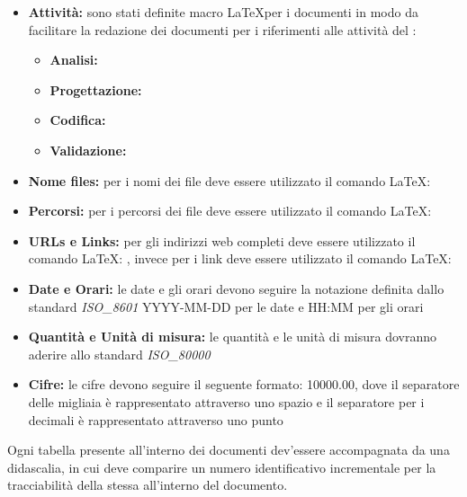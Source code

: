 \documentclass[12pt,a4paper]{article}
\begin{document}
\begin{itemize}
\begin{itemize}
		\item \textbf{\MU:} 
	\end{itemize}
	\item \textbf{Attività:} sono stati definite macro  \LaTeX per i documenti in modo da facilitare la redazione dei documenti per i riferimenti alle attività del \PdP:
	\begin{itemize}
		\item \textbf{Analisi:} 
		\item \textbf{Progettazione:} 
		\item \textbf{Codifica:} 
		\item \textbf{Validazione:} 
	\end{itemize}
\end{itemize}

\label{formati}
\begin{itemize}
	\item \textbf{Nome files:} per i nomi dei file deve essere utilizzato il comando \LaTeX: 
	\item  \textbf{Percorsi:} per i percorsi dei file deve essere utilizzato il comando \LaTeX: 
	\item \textbf{URLs e Links:}  per gli indirizzi web completi deve essere utilizzato il comando \LaTeX: , invece per i link deve essere utilizzato il comando \LaTeX: 
	\item \textbf{Date e Orari:} le date e gli orari devono seguire la notazione definita dallo standard \textit{ISO\_8601} YYYY-MM-DD per le date e HH:MM per gli orari
	\item \textbf{Quantità e Unità di misura:} le quantità e le unità di misura dovranno aderire allo standard \textit{ISO\_80000}
	\item \textbf{Cifre:} le cifre devono seguire il seguente formato: \num{10000.00}, dove il separatore delle migliaia è rappresentato attraverso uno spazio e il separatore per i decimali è rappresentato attraverso uno punto
\end{itemize}

Ogni tabella presente all'interno dei documenti dev'essere accompagnata da una didascalia, in cui deve comparire un numero identificativo incrementale per la tracciabilità della stessa all'interno del documento.
\end{document}
